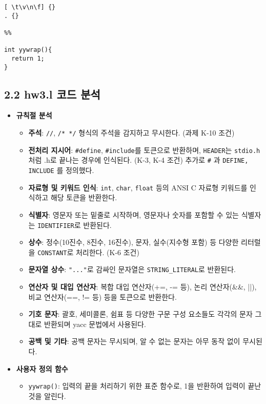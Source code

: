 \documentclass{article}
\begin{document}
\begin{lstlisting}
[ \t\v\n\f] {}
. {}

%%

int yywrap(){
  return 1;
}
\end{lstlisting}

\subsection{2.2 hw3.l 코드 분석}

\begin{itemize}

  \item \textbf{규칙절 분석}
  \begin{itemize}
    \item \textbf{주석}: \texttt{//}, \texttt{/* */} 형식의 주석을 감지하고 무시한다. (과제 K-10 조건)
    \item \textbf{전처리 지시어}: \texttt{\#define}, \texttt{\#include}를 토큰으로 반환하며, \texttt{HEADER}는 \texttt{stdio.h}처럼 .h로 끝나는 경우에 인식된다. (K-3, K-4 조건) 추가로 \texttt{\#} 과 \texttt{DEFINE, INCLUDE} 를 정의했다.
    \item \textbf{자료형 및 키워드 인식}: \texttt{int}, \texttt{char}, \texttt{float} 등의 ANSI C 자료형 키워드를 인식하고 해당 토큰을 반환한다.
    \item \textbf{식별자}: 영문자 또는 밑줄로 시작하며, 영문자나 숫자를 포함할 수 있는 식별자는 \texttt{IDENTIFIER}로 반환된다.
    \item \textbf{상수}: 정수(10진수, 8진수, 16진수), 문자, 실수(지수형 포함) 등 다양한 리터럴을 \texttt{CONSTANT}로 처리한다. (K-6 조건)
    \item \textbf{문자열 상수}: \texttt{"..."}로 감싸인 문자열은 \texttt{STRING\_LITERAL}로 반환된다.
    \item \textbf{연산자 및 대입 연산자}: 복합 대입 연산자(+=, -= 등), 논리 연산자(\&\&, ||), 비교 연산자(==, != 등) 등을 토큰으로 반환한다.
    \item \textbf{기호 문자}: 괄호, 세미콜론, 쉼표 등 다양한 구문 구성 요소들도 각각의 문자 그대로 반환되며 yacc 문법에서 사용된다.
    \item \textbf{공백 및 기타}: 공백 문자는 무시되며, 알 수 없는 문자는 아무 동작 없이 무시된다.
  \end{itemize}

  \item \textbf{사용자 정의 함수}
  \begin{itemize}
    \item \texttt{yywrap()}: 입력의 끝을 처리하기 위한 표준 함수로, 1을 반환하여 입력이 끝난 것을 알린다.
  \end{itemize}
\end{itemize}
\end{document}
